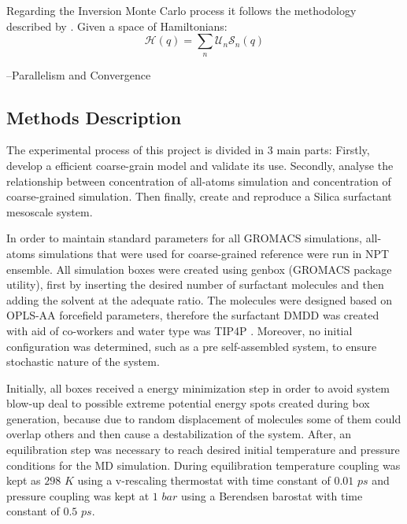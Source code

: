 \documentclass[10pt,a4paper,twoside]{article}
\begin{document}
 Regarding the Inversion Monte Carlo process it follows the methodology described by . Given a space of Hamiltonians:
 \begin{equation}
\mathcal{H}(q) = \displaystyle \sum_{n} \mathcal{U}_n\mathcal{S}_n(q)
\label{eqn:hami}
\end{equation}
 
 --Parallelism and Convergence
 
\subsection{Methods Description} 
The experimental process of this project is divided in 3 main parts: Firstly, develop a efficient coarse-grain model and validate its use. Secondly, analyse the relationship between concentration  of all-atoms simulation and concentration of coarse-grained simulation. Then finally, create and reproduce a Silica surfactant mesoscale system. 

In order to maintain standard parameters for all GROMACS simulations, all-atoms simulations that were used for coarse-grained reference were run in NPT ensemble. All simulation boxes were created using genbox (GROMACS package utility), first by inserting the desired number of surfactant molecules and then adding the solvent at the adequate ratio. The molecules were designed based on OPLS-AA forcefield \cite{opls} parameters, %
therefore the surfactant DMDD was created with aid of co-workers and water type was TIP4P \cite{tip4p}. %
Moreover, no initial configuration was determined, such as a pre self-assembled system, to ensure stochastic nature of the system.  

Initially, all boxes received a energy minimization step in order to avoid system blow-up deal to possible extreme potential energy spots created during box generation, because due to random displacement of molecules some of them could overlap others and then cause a destabilization of the system. After, an equilibration step was necessary to reach desired initial temperature and pressure conditions for the MD simulation. During equilibration temperature coupling was kept as $298$ $K$ using a v-rescaling thermostat \cite{vthermostat} with time constant of $0.01$ $ps$ and pressure coupling was kept at $1$ $bar$ using a Berendsen barostat \cite{bbarostat} with time constant of $0.5$  $ps$.
\end{document}
